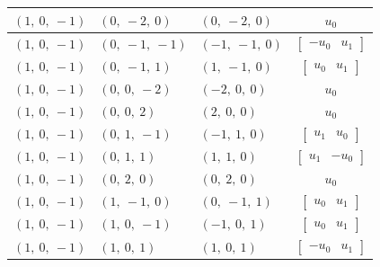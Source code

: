 \documentclass[11pt]{article}
\theoremstyle{definition}
\begin{document}
\begin{longtable}{|l|l|l|c|}
    \hline
    $\left( 1, \  0, \  -1\right)$ & $\left( 0, \  -2, \  0\right)$ & $\left( 0, \  -2, \  0\right)$ & $u_{0}$ \\
    \hline
    $\left( 1, \  0, \  -1\right)$ & $\left( 0, \  -1, \  -1\right)$ & $\left( -1, \  -1, \  0\right)$ & $\left[\begin{matrix}- u_{0} & u_{1}\end{matrix}\right]$ \\
    \hline
    $\left( 1, \  0, \  -1\right)$ & $\left( 0, \  -1, \  1\right)$ & $\left( 1, \  -1, \  0\right)$ & $\left[\begin{matrix}u_{0} & u_{1}\end{matrix}\right]$ \\
    \hline
    $\left( 1, \  0, \  -1\right)$ & $\left( 0, \  0, \  -2\right)$ & $\left( -2, \  0, \  0\right)$ & $u_{0}$ \\
    \hline
    $\left( 1, \  0, \  -1\right)$ & $\left( 0, \  0, \  2\right)$ & $\left( 2, \  0, \  0\right)$ & $u_{0}$ \\
    \hline
    $\left( 1, \  0, \  -1\right)$ & $\left( 0, \  1, \  -1\right)$ & $\left( -1, \  1, \  0\right)$ & $\left[\begin{matrix}u_{1} & u_{0}\end{matrix}\right]$ \\
    \hline
    $\left( 1, \  0, \  -1\right)$ & $\left( 0, \  1, \  1\right)$ & $\left( 1, \  1, \  0\right)$ & $\left[\begin{matrix}u_{1} & - u_{0}\end{matrix}\right]$ \\
    \hline
    $\left( 1, \  0, \  -1\right)$ & $\left( 0, \  2, \  0\right)$ & $\left( 0, \  2, \  0\right)$ & $u_{0}$ \\
    \hline
    $\left( 1, \  0, \  -1\right)$ & $\left( 1, \  -1, \  0\right)$ & $\left( 0, \  -1, \  1\right)$ & $\left[\begin{matrix}u_{0} & u_{1}\end{matrix}\right]$ \\
    \hline
    $\left( 1, \  0, \  -1\right)$ & $\left( 1, \  0, \  -1\right)$ & $\left( -1, \  0, \  1\right)$ & $\left[\begin{matrix}u_{0} & u_{1}\end{matrix}\right]$ \\
    \hline
    $\left( 1, \  0, \  -1\right)$ & $\left( 1, \  0, \  1\right)$ & $\left( 1, \  0, \  1\right)$ & $\left[\begin{matrix}- u_{0} & u_{1}\end{matrix}\right]$ \\

\end{longtable}
\end{document}
